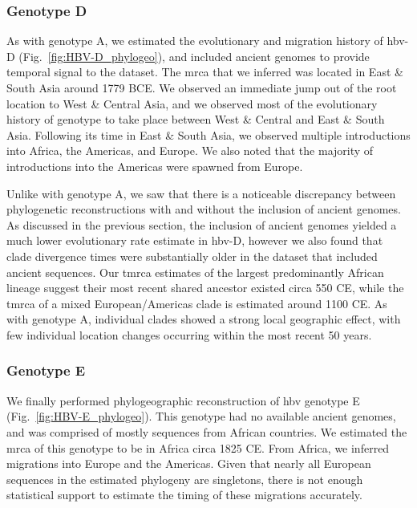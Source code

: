 \subsubsection{Genotype D}

As with genotype A, we estimated the evolutionary and migration history of \gls{hbv}-D (Fig.~\ref{fig:HBV-D_phylogeo}), and included ancient genomes to provide temporal signal to the dataset.
The \gls{mrca} that we inferred was located in East \& South Asia around 1779 BCE.
We observed an immediate jump out of the root location to West \& Central Asia, and we observed most of the evolutionary history of genotype to take place between West \& Central and East \& South Asia.
Following its time in East \& South Asia, we observed multiple introductions into Africa, the Americas, and Europe.
We also noted that the majority of introductions into the Americas were spawned from Europe.

Unlike with genotype A, we saw that there is a noticeable discrepancy between phylogenetic reconstructions with and without the inclusion of ancient genomes.
As discussed in the previous section, the inclusion of ancient genomes yielded a much lower evolutionary rate estimate in \gls{hbv}-D, however we also found that clade divergence times were substantially older in the dataset that included ancient sequences.
Our \gls{tmrca} estimates of the largest predominantly African lineage suggest their most recent shared ancestor existed circa 550 CE, while the \gls{tmrca} of a mixed European/Americas clade is estimated around 1100 CE.
As with genotype A, individual clades showed a strong local geographic effect, with few individual location changes occurring within the most recent 50 years.

\subsubsection{Genotype E}

We finally performed phylogeographic reconstruction of \gls{hbv} genotype E (Fig.~\ref{fig:HBV-E_phylogeo}).
This genotype had no available ancient genomes, and was comprised of mostly sequences from African countries.
We estimated the \gls{mrca} of this genotype to be in Africa circa 1825 CE.
From Africa, we inferred migrations into Europe and the Americas.
Given that nearly all European sequences in the estimated phylogeny are singletons, there is not enough statistical support to estimate the timing of these migrations accurately.

